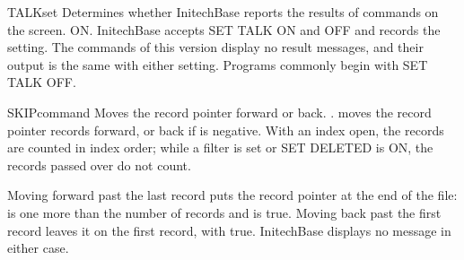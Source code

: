 \begin{XbaseEntry}{TALK}{set}
Determines whether InitechBase reports the results of commands on the screen.
\Syntax
{}
\Defaults
ON.
\Usage
InitechBase accepts SET TALK ON and OFF and records the setting.  The commands
of this version display no result messages, and their output is the same with
either setting.  Programs commonly begin with SET TALK OFF.
\end{XbaseEntry}

\begin{XbaseEntry}{SKIP}{command}
Moves the record pointer forward or back.
\Syntax
{}
.
\Usage
{} moves the record pointer  records forward, or back if
 is negative.  With an index open, the records are counted in index
order; while a filter is set or SET DELETED is ON, the records passed over do
not count.

Moving forward past the last record puts the record pointer at the end of the
file:  is one more than the number of records and  is
true.  Moving back past the first record leaves it on the first record, with
 true.  InitechBase displays no message in either case.
\Examples
{}
\end{XbaseEntry}

